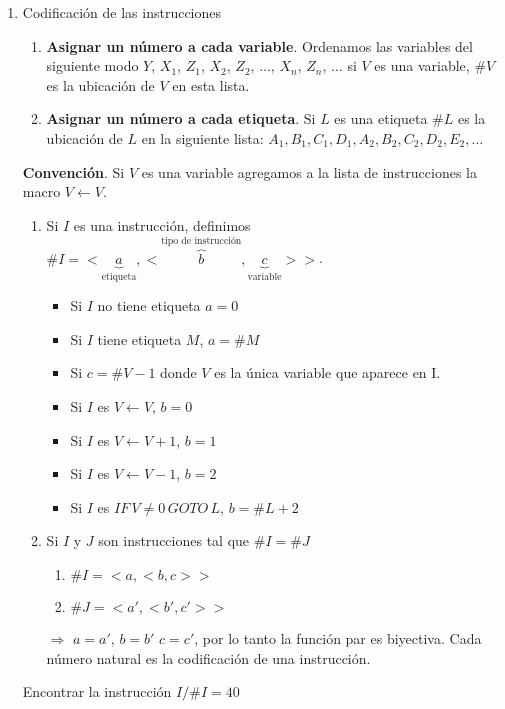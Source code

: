 \begin{enumerate}
	\item Codificaci\'on de las instrucciones
		\begin{enumerate}
			\item \textbf{Asignar un n\'umero a cada variable}. Ordenamos las variables del 					siguiente modo $Y$, $X_1$, $Z_1$, $X_2$, $Z_2$, $\ldots$, $X_n$, $Z_n$, $\ldots$ si 				$V$ es una variable, $\#V$ es la ubicaci\'on de $V$ en esta lista.
			\item \textbf{Asignar un n\'umero a cada etiqueta}. Si $L$ es una etiqueta $\#L$ es la 			ubicaci\'on de $L$ en la siguiente lista: $A_1, B_1, C_1, D_1, A_2, B_2, C_2, D_2, 					E_2, \ldots$
		\end{enumerate}
		\noindent
		\textbf{Convenci\'on}. Si $V$ es una variable agregamos a la lista de instrucciones la 				macro $V \leftarrow V$.
	\begin{enumerate}
		\item Si $I$ es una instrucci\'on, definimos $\# I = <\underbrace{a}_{\text{etiqueta}}, < 			\overbrace{b}^{\text{tipo de instrucci\'on}}, \underbrace{c}_{\text{variable}}>>$.
		\begin{itemize}
			\item Si $I$ no tiene etiqueta $a = 0$
			\item Si $I$ tiene etiqueta $M$, $a = \# M$
			\item Si $c = \# V - 1$ donde $V$ es la \'unica variable que aparece en I.
			\item Si $I$ es $V \leftarrow V$, $b = 0$
			\item Si $I$ es $V \leftarrow V + 1$, $b = 1$
			\item Si $I$ es $V \leftarrow V - 1$, $b = 2$
			\item Si $I$ es $IF \, V \neq 0 \, GOTO \, L$, $b = \#L + 2$
		\end{itemize}
		\item Si $I$ y $J$ son instrucciones tal que $\# I = \#J$
			\begin{enumerate}
				\item [] $\# I = <a, <b, c>>$
				\item [] $\# J = <a', <b', c'>>$
			\end{enumerate}
			\noindent
			$\Rightarrow$ $a = a'$, $b = b'$ $c = c'$, por lo tanto la funci\'on par es biyectiva. 			Cada n\'umero natural es la codificaci\'on de una instrucci\'on.
	\end{enumerate}
	\begin{example}
		Encontrar la instrucci\'on $I / \# I = 40$
		

\end{example}
\end{enumerate}
